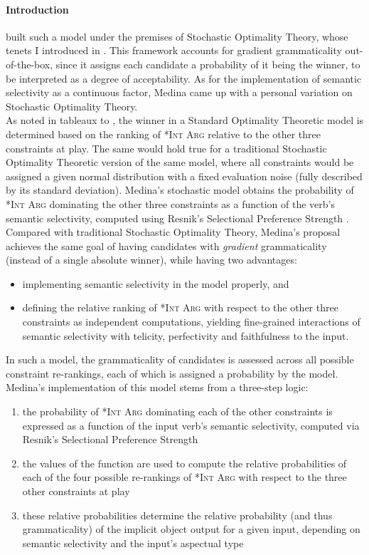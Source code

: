 \paragraph{Introduction} \textcite{Medina2007} built such a model under the premises of Stochastic Optimality Theory, whose tenets I introduced in . This framework accounts for gradient grammaticality out-of-the-box, since it assigns each candidate a probability of it being the winner, to be interpreted as a degree of acceptability. As for the implementation of semantic selectivity as a continuous factor, Medina came up with a personal variation on Stochastic Optimality Theory.\\
As noted in tableaux  to , the winner in a Standard Optimality Theoretic model is determined based on the ranking of \textsc{*Int Arg} relative to the other three constraints at play. The same would hold true for a traditional Stochastic Optimality Theoretic version of the same model, where all constraints would be assigned a given normal distribution with a fixed evaluation noise (fully described by its standard deviation). Medina's stochastic model obtains the probability of \textsc{*Int Arg} dominating the other three constraints as a function of the verb's semantic selectivity, computed using Resnik's Selectional Preference Strength \parencite{Resnik1993,Resnik1996}. Compared with traditional Stochastic Optimality Theory, Medina's proposal achieves the same goal of having candidates with \textit{gradient} grammaticality (instead of a single absolute winner), while having two advantages:
\begin{itemize}
    \item implementing semantic selectivity in the model properly, and
    \item defining the relative ranking of \textsc{*Int Arg} with respect to the other three constraints as independent computations, yielding fine-grained interactions of semantic selectivity with telicity, perfectivity and faithfulness to the input.
\end{itemize}
In such a model, the grammaticality of candidates is assessed across all possible constraint re-rankings, each of which is assigned a probability by the model. Medina's implementation of this model stems from a three-step logic: 
\begin{enumerate}
    \item the probability of \textsc{*Int Arg} dominating each of the other constraints is expressed as a function of the input verb's semantic selectivity, computed via Resnik's Selectional Preference Strength
    \item the values of the function are used to compute the relative probabilities of each of the four possible re-rankings of \textsc{*Int Arg} with respect to the three other constraints at play
    \item these relative probabilities determine the relative probability (and thus grammaticality) of the implicit object output for a given input, depending on semantic selectivity and the input's aspectual type
\end{enumerate}

